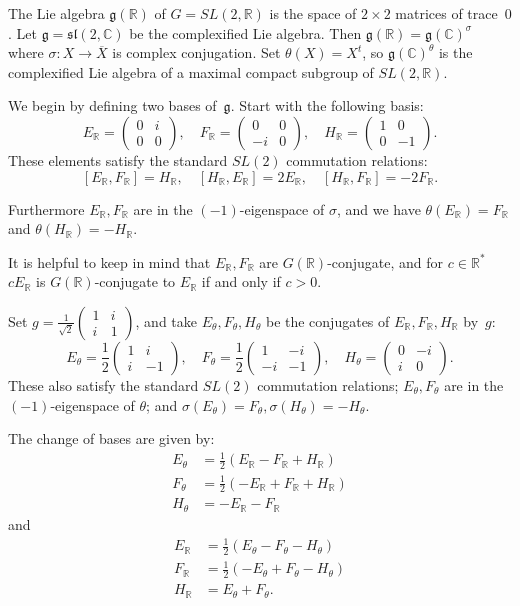 \documentclass[10pt,leqno]{article}
\numberwithin{equation}{section}
\newcommand{\R}{\mathbb R}
\newcommand{\C}{\mathbb C}
\renewcommand{\sl}{\mathfrak s\mathfrak l}
\newcommand{\g}{\mathfrak g}
\begin{document}
The  Lie algebra $\g(\R)$  of $G=SL(2,\R)$  is the space of $2\times 2$  matrices of trace~$0$.
Let $\g=\sl(2,\C)$ be the complexified Lie algebra.
Then $\g(\R)=\g(\C)^\sigma$ where $\sigma\colon X \to \overline X$ is complex conjugation. 
Set $\theta(X)=X^t$, so $\g(\C)^\theta$  is the complexified Lie algebra of a maximal compact subgroup of $SL(2,\R)$.

We begin by defining two  bases of~$\g$. Start with the following basis:
$$
E_\R=\begin{pmatrix}0&i\\0&0\end{pmatrix},\quad 
F_\R=\begin{pmatrix}0&0\\-i&0\end{pmatrix},\quad
H_\R=\begin{pmatrix}1&0\\0&-1\end{pmatrix}.
$$
These elements satisfy the standard $SL(2)$ commutation relations: 
\[ [E_\R, F_\R] = H_\R, \quad [H_\R, E_\R] = 2E_\R, \quad [H_\R, F_\R] = -2F_\R. \]

Furthermore $E_\R,F_\R$ are in the $(-1)$-eigenspace of $\sigma$, and we have
$\theta(E_\R)=F_\R$ and $\theta(H_\R)=-H_\R$.

It is helpful to keep in mind that $E_\R,F_\R$ are $G(\R)$-conjugate,
and for $c\in \R^*$ $cE_\R$ is $G(\R)$-conjugate to $E_\R$ if and only if $c>0$.

Set $g=\frac 1{\sqrt 2}\begin{pmatrix}1&i\\i&1
\end{pmatrix}$, and take $E_\theta,F_\theta,H_\theta$ be the conjugates of $E_\R,F_\R,H_\R$ by~$g$:
$$
E_\theta=\frac12\begin{pmatrix}1&i\\i&-1\end{pmatrix}, \quad
F_\theta=\frac12\begin{pmatrix}1&-i\\-i&-1\end{pmatrix},\quad
H_\theta=\begin{pmatrix}0&-i\\i&0\end{pmatrix}.
$$
These also satisfy the standard $SL(2)$ commutation relations; $E_\theta,F_\theta$ are in the $(-1)$-eigenspace of $\theta$; 
and  $\sigma(E_\theta)=F_\theta,\sigma(H_\theta)=-H_\theta$.

The change of bases are given by:
$$
\begin{aligned}
  E_\theta&=\frac12(E_\R-F_\R+H_\R)\\
  F_\theta&=\frac12(-E_\R+F_\R+H_\R)\\
  H_\theta&=-E_\R-F_\R
\end{aligned}
$$
and
$$
\begin{aligned}
  E_\R&=\frac12(E_\theta-F_\theta-H_\theta)\\
  F_\R&=\frac12(-E_\theta+F_\theta-H_\theta)\\
  H_\R&=E_\theta+F_\theta.
\end{aligned}
$$
\end{document}

